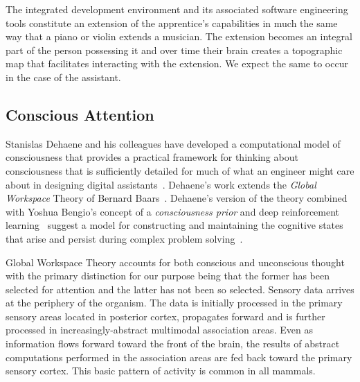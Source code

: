 \documentclass[letterpaper,11pt]{article}
\begin{document}
The integrated development environment and its associated software engineering tools constitute an extension of the apprentice’s capabilities in much the same way that a piano or violin extends a musician. The extension becomes an integral part of the person possessing it and over time their brain creates a topographic map that facilitates interacting with the extension. We expect the same to occur in the case of the assistant. 


\subsection{Conscious Attention}
\label{subsection_conscious_attention}




Stanislas Dehaene and his colleagues have developed a computational model of consciousness that provides a practical framework for thinking about consciousness that is sufficiently detailed for much of what an engineer might care about in designing digital assistants~\cite{Dehaene2014}. Dehaene's work extends the {\it{Global Workspace}} Theory of Bernard Baars~\cite{Baars1988}. Dehaene's version of the theory combined with Yoshua Bengio's concept of a {\it{consciousness prior}} and deep reinforcement learning~\cite{MnihetalCoRR-13,NairetalCoRR-15} suggest a model for constructing and maintaining the cognitive states that arise and persist during complex problem solving~\cite{BengioCoRR-17}.

Global Workspace Theory accounts for both conscious and unconscious thought with the primary distinction for our purpose being that the former has been selected for attention and the latter has not been so selected. Sensory data arrives at the periphery of the organism. The data is initially processed in the primary sensory areas located in posterior cortex, propagates forward and is further processed in increasingly-abstract multimodal association areas. Even as information flows forward toward the front of the brain, the results of abstract computations performed in the association areas are fed back toward the primary sensory cortex. This basic pattern of activity is common in all mammals.
\end{document}
